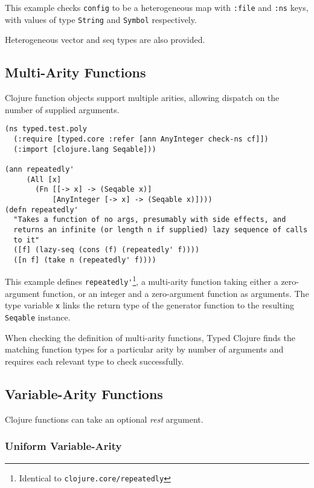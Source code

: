 This example checks \lstinline|config| to be a heterogeneous map
with \lstinline|:file| and \lstinline|:ns| keys, with values of
type \lstinline|String| and \lstinline|Symbol| respectively.

Heterogeneous vector and seq types are also provided.

\subsection{Multi-Arity Functions}

Clojure function objects support multiple arities, allowing dispatch
on the number of supplied arguments.

\begin{lstlisting}[caption=Annotating multi-arity functions in Typed Clojure]
(ns typed.test.poly
  (:require [typed.core :refer [ann AnyInteger check-ns cf]])
  (:import [clojure.lang Seqable]))

(ann repeatedly'
     (All [x]
       (Fn [[-> x] -> (Seqable x)]
           [AnyInteger [-> x] -> (Seqable x)])))
(defn repeatedly'
  "Takes a function of no args, presumably with side effects, and
  returns an infinite (or length n if supplied) lazy sequence of calls
  to it"
  ([f] (lazy-seq (cons (f) (repeatedly' f))))
  ([n f] (take n (repeatedly' f))))
\end{lstlisting}

This example defines \lstinline|repeatedly'|\footnote{Identical to \lstinline|clojure.core/repeatedly|},
a multi-arity function taking either a zero-argument function, or an integer and a zero-argument function as arguments.
The type variable \lstinline|x| links the return type of the generator function to
the resulting \lstinline|Seqable| instance.

When checking the definition of multi-arity functions, Typed Clojure
finds the matching function types for a particular arity by number of arguments
and requires each relevant type to check successfully.

\subsection{Variable-Arity Functions}

Clojure functions can take an optional \emph{rest} argument.

\subsubsection{Uniform Variable-Arity}

